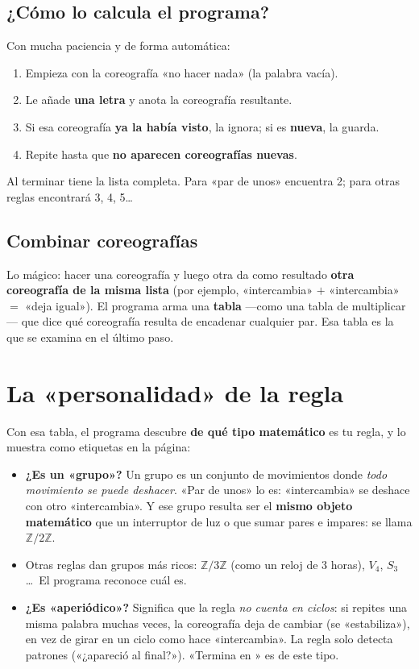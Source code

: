\documentclass[11pt,a4paper]{article}
\newcommand{\code}[1]{{\ttfamily #1}}
\begin{document}
\subsection{¿Cómo lo calcula el programa?}
Con mucha paciencia y de forma automática:
\begin{enumerate}[leftmargin=1.6em]
  \item Empieza con la coreografía «no hacer nada» (la palabra vacía).
  \item Le añade \textbf{una letra} y anota la coreografía resultante.
  \item Si esa coreografía \textbf{ya la había visto}, la ignora; si es
        \textbf{nueva}, la guarda.
  \item Repite hasta que \textbf{no aparecen coreografías nuevas}.
\end{enumerate}
Al terminar tiene la lista completa. Para «par de unos» encuentra 2; para otras
reglas encontrará 3, 4, 5\ldots

\subsection{Combinar coreografías}
Lo mágico: hacer una coreografía y luego otra da como resultado \textbf{otra
coreografía de la misma lista} (por ejemplo, «intercambia» $+$ «intercambia» $=$
«deja igual»). El programa arma una \textbf{tabla} —como una tabla de
multiplicar— que dice qué coreografía resulta de encadenar cualquier par. Esa
tabla es la que se examina en el último paso.

\section{La «personalidad» de la regla}

Con esa tabla, el programa descubre \textbf{de qué tipo matemático} es tu regla,
y lo muestra como etiquetas en la página:

\begin{itemize}
  \item \textbf{¿Es un «grupo»?} Un grupo es un conjunto de movimientos donde
        \emph{todo movimiento se puede deshacer}. «Par de unos» lo es:
        «intercambia» se deshace con otro «intercambia». Y ese grupo resulta ser
        el \textbf{mismo objeto matemático} que un interruptor de luz o que sumar
        pares e impares: se llama $\mathbb{Z}/2\mathbb{Z}$.
  \item Otras reglas dan grupos más ricos: $\mathbb{Z}/3\mathbb{Z}$ (como un reloj
        de 3 horas), $V_4$, $S_3$\ldots\ El programa reconoce cuál es.
  \item \textbf{¿Es «aperiódico»?} Significa que la regla \emph{no cuenta en
        ciclos}: si repites una misma palabra muchas veces, la coreografía deja
        de cambiar (se «estabiliza»), en vez de girar en un ciclo como hace
        «intercambia». La regla solo detecta patrones («¿apareció \code{01} al
        final?»). «Termina en \code{01}» es de este tipo.
\end{itemize}
\end{document}
